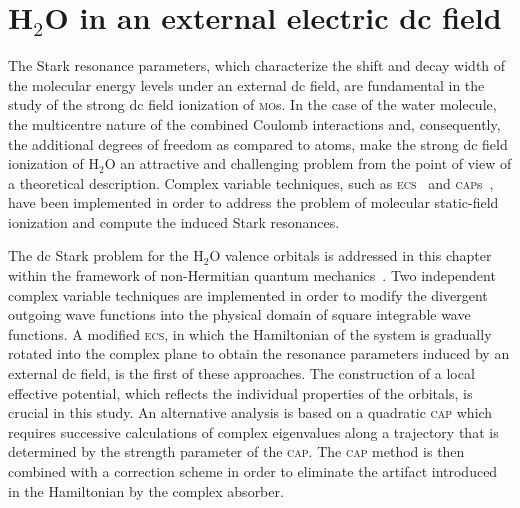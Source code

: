 \chapter{H$_{2}$O in an external electric dc field}
\label{ch:dc_h2o}



The Stark resonance parameters, which characterize the shift and decay
width of the molecular energy levels under an external dc field, are
fundamental in the study of the strong dc field ionization of
\textsc{mo}s. In the case of the water molecule, the multicentre
nature of the combined Coulomb interactions and, consequently, the
additional degrees of freedom as compared to atoms, make the strong dc
field ionization of H$_{2}$O an attractive and challenging problem
from the point of view of a theoretical description.
Complex variable techniques, such as
\textsc{ecs}~\cite{Simon_1979,ecsScrinzi} and
\textsc{cap}s~\cite{RissMeyer_1993,Krause_2014}, have been implemented
in order to address the problem of molecular static-field ionization
and compute the induced Stark resonances.

The dc Stark problem for the H$_{2}$O valence orbitals is addressed in
this chapter within the framework of non-Hermitian quantum
mechanics~\cite{Moiseyev_NHQM}. Two independent complex variable
techniques are implemented in order to modify the divergent outgoing
wave functions into the physical domain of square integrable wave
functions. A modified \textsc{ecs}, in which the Hamiltonian of the
system is gradually rotated into the complex plane to obtain the
resonance parameters induced by an external dc field, is the first of
these approaches. The construction of a local effective potential,
which reflects the individual properties of the orbitals, is crucial
in this study. An alternative analysis is based on a quadratic
\textsc{cap} which requires successive calculations of complex
eigenvalues along a trajectory that is determined by the strength
parameter of the \textsc{cap}. The \textsc{cap} method is then
combined with a correction scheme in order to eliminate the artifact
introduced in the Hamiltonian by the complex absorber.

